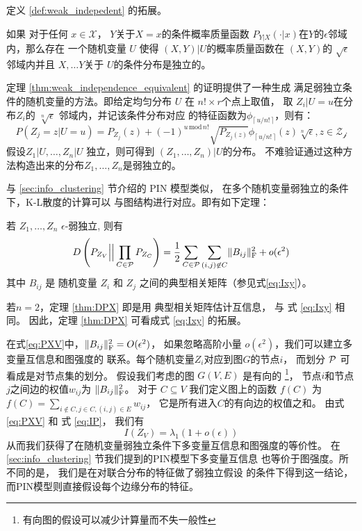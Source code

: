 定义 \ref{def:weak_indepedent} 的拓展。
\begin{theorem}\label{thm:weak_independence_equivalent}
  如果 对于任何 $x \in \mathcal{X}$，
$Y$关于$X=x$的条件概率质量函数
$P_{Y|X}(\cdot |x)$在$Y$的$\epsilon$邻域内，那么存在
一个随机变量 $U$
  使得
  $(X, Y)|U$的概率质量函数在 $(X, Y)$的
  $\sqrt{\epsilon}$邻域内并且
  $X, \dots Y$关于
  $U$的条件分布是独立的。
\end{theorem}
  定理 \ref{thm:weak_independence_equivalent} 的证明提供了一种生成
  满足弱独立条件的随机变量的方法。即给定均匀分布
  $U$ 在 $n! \times r$个点上取值，
  取 $Z_i|U=u$在分布$Z_i$的
  $\sqrt[n]{\epsilon}$ 邻域内，并记该条件分布对应
  的特征函数为$\phi_{\lceil\, u/n!\, \rceil}$，则有：
  \begin{equation}
    P(Z_j=z|U=u) = P_{Z_j}(z) + 
    (-1)^{u \,\mathrm{mod}\, n!}\sqrt{P_{Z_j(z)}}
    \phi_{\lceil\, u/n!\, \rceil}(z) \sqrt[n]{\epsilon}, z \in \mathcal{Z_j}
  \end{equation}
  假设$Z_1|U, \dots, Z_n|U$ 独立，则可得到
  $(Z_1, \dots, Z_n)|U$的分布。
  不难验证通过这种方法构造出来的分布$Z_1, \dots, Z_n$是弱独立的。

与 \ref{sec:info_clustering} 节介绍的 PIN 模型类似，
在多个随机变量弱独立的条件下，K-L散度的计算可以
与图结构进行对应。即有如下定理：
\begin{theorem}\label{thm:DPX}
若 $Z_1, \dots, Z_n$ $\epsilon$-弱独立, 则有
\begin{equation}\label{eq:PXV}
D\left(P_{Z_V} \Big|\Big| \prod_{C\in \P} P_{Z_C} \right)
= {1 \over 2}
\sum_{C\in \P}\sum_{(i,j) \not\in C} \norm{B_{ij}}_{\mathrm{F}}^2 + o(\epsilon^2)
\end{equation}
其中 $B_{ij}$ 是 随机变量  $Z_i$ 和 $Z_j$
之间的典型相关矩阵（参见式\eqref{eq:Ixy}）。
\end{theorem}
若$ n = 2$，定理 \ref{thm:DPX} 即是用 典型相关矩阵估计互信息，
与 式 \eqref{eq:Ixy} 相同。
因此，定理 \ref{thm:DPX} 可看成式 \eqref{eq:Ixy} 
的拓展。

在式\eqref{eq:PXV}中，$\norm{B_{ij}}_{\mathrm{F}}^2 =O(\epsilon^2)$，
如果忽略高阶小量 $o(\epsilon^2)$，我们可以建立多变量互信息和图强度的
联系。每个随机变量$Z_i$对应到图$G$的节点$i$，
而划分 $\P$
可看成是对节点集的划分。
假设我们考虑的图 $G(V, E)$ 是有向的
\footnote{有向图的假设可以减少计算量而不失一般性}，
节点$i$和节点$j$之间边的权值$w_{ij}$为
$\norm{B_{ij}}_{\mathrm{F}}^2$。
对于 $C\subseteq V$
我们定义图上的函数 $f(C)$ 
 为 $f(C) = \sum_{i\not\in C, j\in C, (i,j) \in E} w_{ij}$，
它是所有进入$C$的有向边的权值之和。
由式\eqref{eq:PXV}
和 式 \eqref{eq:IP}，
我们有
\begin{equation}\label{eq:PXV_Data_Simplified}
I(Z_V) = \lambda_1 (1 + o(\epsilon))
\end{equation}
从而我们获得了在随机变量弱独立条件下多变量互信息和图强度的等价性。
在 \ref{sec:info_clustering} 节我们提到的PIN模型下多变量互信息
也等价于图强度。所不同的是，
我们是在对联合分布的特征做了弱独立假设
的条件下得到这一结论，而PIN模型则直接假设每个边缘分布的特征。

